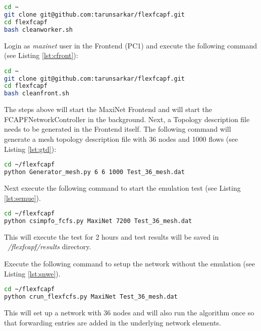 \begin{lstlisting}[caption={Clean worker},label={lst:cworker},language=bash,tabsize=2,basicstyle=\footnotesize,breaklines=true,showspaces=false,showstringspaces=false,showtabs=false,frame=single]
cd ~
git clone git@github.com:tarunsarkar/flexfcapf.git
cd flexfcapf
bash cleanworker.sh
\end{lstlisting}

Login as \textit{maxinet} user in the Frontend (PC1) and execute the following command (see Listing \ref{lst:cfront}):

\begin{lstlisting}[caption={Clean frontend},label={lst:cfront},language=bash,tabsize=2,basicstyle=\footnotesize,breaklines=true,showspaces=false,showstringspaces=false,showtabs=false,frame=single]
cd ~
git clone git@github.com:tarunsarkar/flexfcapf.git
cd flexfcapf
bash cleanfront.sh
\end{lstlisting}

The steps above will start the MaxiNet Frontend and will start the FCAPFNetworkController in the background. Next, a Topology description file needs to be generated in the Frontend itself. The following command will generate a mesh topology description file with 36 nodes and 1000 flows (see Listing \ref{lst:gtd}):

\begin{lstlisting}[caption={Generate topology description},label={lst:gtd},language=bash,tabsize=2,basicstyle=\footnotesize,breaklines=true,showspaces=false,showstringspaces=false,showtabs=false,frame=single]
cd ~/flexfcapf
python Generator_mesh.py 6 6 1000 Test_36_mesh.dat
\end{lstlisting}

Next execute the following command to start the emulation test (see Listing \ref{lst:semue}).

\begin{lstlisting}[caption={Start emulation exeution},label={lst:semue},language=bash,tabsize=2,basicstyle=\footnotesize,breaklines=true,showspaces=false,showstringspaces=false,showtabs=false,frame=single]
cd ~/flexfcapf
python csimpfo_fcfs.py MaxiNet 7200 Test_36_mesh.dat
\end{lstlisting}
This will execute the test for 2 hours and test results will be saved in \textit{~/flexfcapf/results} directory.

Execute the following command to setup the network without the emulation (see Listing \ref{lst:snwe}).
\begin{lstlisting}[caption={Setup network without emulation},label={lst:snwe},language=bash,tabsize=2,basicstyle=\footnotesize,breaklines=true,showspaces=false,showstringspaces=false,showtabs=false,frame=single]
cd ~/flexfcapf
python crun_flexfcfs.py MaxiNet Test_36_mesh.dat
\end{lstlisting}

This will set up a network with 36 nodes and will also run the algorithm once so that forwarding entries are added in the underlying network elements.